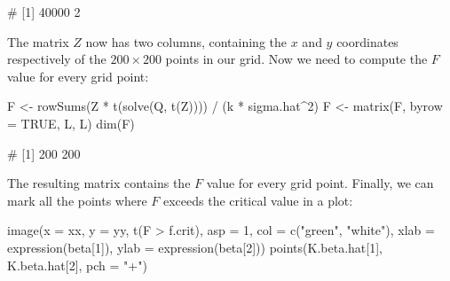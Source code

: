 \documentclass[
  a4paper,
]{article}
\newenvironment{Shaded}{\begin{snugshade}}{\end{snugshade}}
\newcommand{\AttributeTok}[1]{\textcolor[rgb]{0.77,0.63,0.00}{#1}}
\newcommand{\ConstantTok}[1]{\textcolor[rgb]{0.00,0.00,0.00}{#1}}
\newcommand{\DecValTok}[1]{\textcolor[rgb]{0.00,0.00,0.81}{#1}}
\newcommand{\FunctionTok}[1]{\textcolor[rgb]{0.00,0.00,0.00}{#1}}
\newcommand{\NormalTok}[1]{#1}
\newcommand{\OtherTok}[1]{\textcolor[rgb]{0.56,0.35,0.01}{#1}}
\newcommand{\SpecialCharTok}[1]{\textcolor[rgb]{0.00,0.00,0.00}{#1}}
\newcommand{\StringTok}[1]{\textcolor[rgb]{0.31,0.60,0.02}{#1}}
\theoremstyle{definition}
\theoremstyle{definition}
\theoremstyle{definition}
\theoremstyle{definition}
\theoremstyle{remark}
\begin{document}
\begin{Shaded}
\begin{Highlighting}[]
\NormalTok{\# [1] 40000     2}
\end{Highlighting}
\end{Shaded}

The matrix \(Z\) now has two columns, containing the \(x\) and \(y\) coordinates
respectively of the \(200\times 200\) points in our grid.
Now we need to compute the \(F\) value for every grid point:

\begin{Shaded}
\begin{Highlighting}[]
\NormalTok{F }\OtherTok{\textless{}{-}} \FunctionTok{rowSums}\NormalTok{(Z }\SpecialCharTok{*} \FunctionTok{t}\NormalTok{(}\FunctionTok{solve}\NormalTok{(Q, }\FunctionTok{t}\NormalTok{(Z)))) }\SpecialCharTok{/}\NormalTok{ (k }\SpecialCharTok{*}\NormalTok{ sigma.hat}\SpecialCharTok{\^{}}\DecValTok{2}\NormalTok{)}
\NormalTok{F }\OtherTok{\textless{}{-}} \FunctionTok{matrix}\NormalTok{(F, }\AttributeTok{byrow =} \ConstantTok{TRUE}\NormalTok{, L, L)}
\FunctionTok{dim}\NormalTok{(F)}
\end{Highlighting}
\end{Shaded}

\begin{Shaded}
\begin{Highlighting}[]
\NormalTok{\# [1] 200 200}
\end{Highlighting}
\end{Shaded}

The resulting matrix contains the \(F\) value for every grid point.
Finally, we can mark all the points where \(F\) exceeds the critical
value in a plot:

\begin{Shaded}
\begin{Highlighting}[]
\FunctionTok{image}\NormalTok{(}\AttributeTok{x =}\NormalTok{ xx, }\AttributeTok{y =}\NormalTok{ yy, }\FunctionTok{t}\NormalTok{(F }\SpecialCharTok{\textgreater{}}\NormalTok{ f.crit), }\AttributeTok{asp =} \DecValTok{1}\NormalTok{,}
      \AttributeTok{col =} \FunctionTok{c}\NormalTok{(}\StringTok{"green"}\NormalTok{, }\StringTok{"white"}\NormalTok{),}
      \AttributeTok{xlab =} \FunctionTok{expression}\NormalTok{(beta[}\DecValTok{1}\NormalTok{]), }\AttributeTok{ylab =} \FunctionTok{expression}\NormalTok{(beta[}\DecValTok{2}\NormalTok{]))}
\FunctionTok{points}\NormalTok{(K.beta.hat[}\DecValTok{1}\NormalTok{], K.beta.hat[}\DecValTok{2}\NormalTok{], }\AttributeTok{pch =} \StringTok{"+"}\NormalTok{)}
\end{Highlighting}
\end{Shaded}
\end{document}
